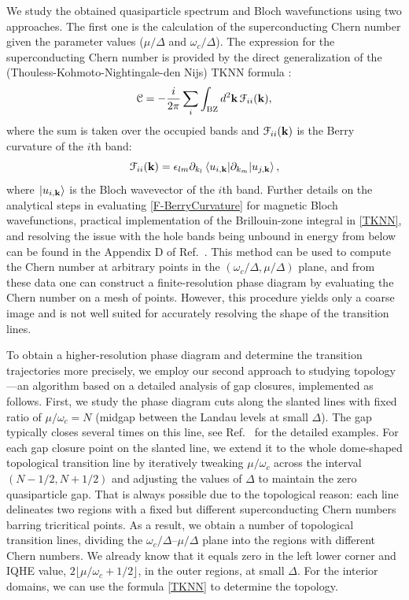 \documentclass[10pt,prb,aps,superscriptaddress,amsmath,amssymb,twocolumn,floatfix,longbibliography]{revtex4-1}
\newcommand{\be}{\begin{equation} }
\newcommand{\ee}{\end{equation}}
\newcommand{\bk}{{\bf k}}
\begin{document}
We study the obtained quasiparticle spectrum and Bloch wavefunctions using two approaches. The first one is the calculation of the superconducting Chern number given the parameter values ($\mu/\Delta$ and $\omega_c/\Delta$). The expression for the superconducting Chern number is provided by the direct generalization of the (Thouless-Kohmoto-Nightingale-den Nijs) TKNN formula \cite{TKNN, Jain2022helical}:
\be \label{TKNN}
    \mathcal{C} = -\frac{i}{2\pi} \sum_i \int_{\text{BZ}} d^2\bk\, \mathcal{F}_{ii}(\bk),
\ee
where the sum is taken over the occupied bands and $\mathcal{F}_{ii}(\bk)$ is the Berry curvature of the $i$th band:
\be \label{F-BerryCurvature}
    \mathcal{F}_{ii}(\bk) = \epsilon_{lm} \partial_{k_l} \left\langle u_{i,\bk} | \partial_{k_m} | u_{j,\bk}\right\rangle,
\ee
where $\left.|u_{i,\bk}\right\rangle $ is the Bloch wavevector of the $i$th band. Further details on the analytical steps in evaluating \eqref{F-BerryCurvature} for magnetic Bloch wavefunctions, practical implementation of the Brillouin-zone integral in \eqref{TKNN}, and resolving the issue with the hole bands being unbound in energy from below can be found in the Appendix D of Ref.~. 
This method can be used to compute the Chern number at arbitrary points in the $(\omega_c/\Delta,\mu/\Delta)$ plane, and from these data one can construct a finite-resolution phase diagram by evaluating the Chern number on a mesh of points. However, this procedure yields only a coarse image and is not well suited for accurately resolving the shape of the transition lines.

To obtain a higher-resolution phase diagram and determine the transition trajectories more precisely, we employ our second approach to studying topology---an algorithm based on a detailed analysis of gap closures, implemented as follows. First, we study the phase diagram cuts along the slanted lines with fixed ratio of $\mu/\omega_c = N$ (midgap between the Landau levels at small $\Delta$). The gap typically closes several times on this line, see Ref.~ for the detailed examples. For each gap closure point on the slanted line, we extend it to the whole dome-shaped topological transition line by iteratively tweaking $\mu/\omega_c$ across the interval $(N - 1/2, N +1/2)$ and adjusting the values of $\Delta$ to maintain the zero quasiparticle gap. That is always possible due to the topological reason: each line delineates two regions with a fixed but different superconducting Chern numbers barring tricritical points. As a result, we obtain a number of topological transition lines, dividing the $\omega_c/\Delta$--$\mu/\Delta$ plane into the regions with different Chern numbers. We already know that it equals zero in the left lower corner and IQHE value, $2 \lfloor \mu / \omega_c + 1/2 \rfloor$, in the outer regions, at small $\Delta$. For the interior domains, we can use the formula \eqref{TKNN} to determine the topology. 
\end{document}
